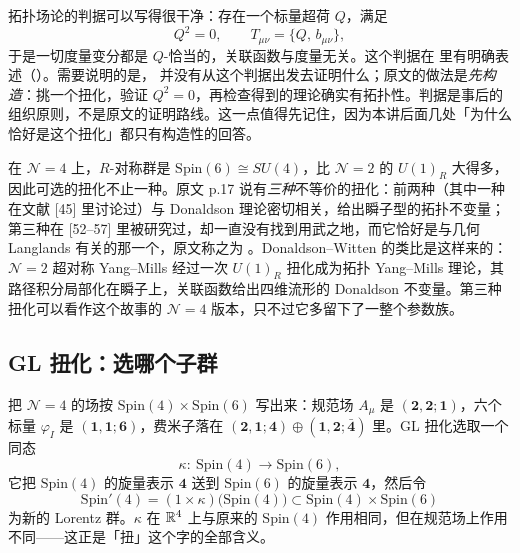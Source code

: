 拓扑场论的判据可以写得很干净：存在一个标量超荷 $Q$，满足
\begin{equation}
Q^2=0,\qquad T_{\mu\nu}=\{Q,\,b_{\mu\nu}\},
\label{eq:top-criterion}
\end{equation}
于是一切度量变分都是 $Q$-恰当的，关联函数与度量无关。这个判据在 \cite{fr09} 里有明确表述（）。需要说明的是，\cite{kw06} 并没有从这个判据出发去证明什么；原文的做法是\emph{先构造}：挑一个扭化，验证 $Q^2=0$，再检查得到的理论确实有拓扑性。判据是事后的组织原则，不是原文的证明路线。这一点值得先记住，因为本讲后面几处「为什么恰好是这个扭化」都只有构造性的回答。

在 $\mathcal N=4$ 上，$R$-对称群是 $\mathrm{Spin}(6)\cong SU(4)$，比 $\mathcal N=2$ 的 $U(1)_R$ 大得多，因此可选的扭化不止一种。原文 p.17 说有\emph{三种}不等价的扭化：前两种（其中一种在文献 [45] 里讨论过）与 Donaldson 理论密切相关，给出瞬子型的拓扑不变量；第三种在 [52--57] 里被研究过，却一直没有找到用武之地，而它恰好是与几何 Langlands 有关的那一个，原文称之为 。Donaldson--Witten 的类比是这样来的：$\mathcal N=2$ 超对称 Yang--Mills 经过一次 $U(1)_R$ 扭化成为拓扑 Yang--Mills 理论，其路径积分局部化在瞬子上，关联函数给出四维流形的 Donaldson 不变量。第三种扭化可以看作这个故事的 $\mathcal N=4$ 版本，只不过它多留下了一整个参数族。

\subsection{GL 扭化：选哪个子群}

把 $\mathcal N=4$ 的场按 $\mathrm{Spin}(4)\times\mathrm{Spin}(6)$ 写出来：规范场 $A_\mu$ 是 $(\mathbf 2,\mathbf 2;\mathbf 1)$，六个标量 $\varphi_I$ 是 $(\mathbf 1,\mathbf 1;\mathbf 6)$，费米子落在 $(\mathbf 2,\mathbf 1;\mathbf 4)\oplus(\mathbf 1,\mathbf 2;\bar{\mathbf 4})$ 里。GL 扭化选取一个同态
\begin{equation}
\kappa:\ \mathrm{Spin}(4)\longrightarrow\mathrm{Spin}(6),
\label{eq:kappa}
\end{equation}
它把 $\mathrm{Spin}(4)$ 的旋量表示 $\mathbf 4$ 送到 $\mathrm{Spin}(6)$ 的旋量表示 $\mathbf 4$，然后令
\begin{equation}
\mathrm{Spin}'(4)=(1\times\kappa)\bigl(\mathrm{Spin}(4)\bigr)\subset \mathrm{Spin}(4)\times\mathrm{Spin}(6)
\label{eq:spinx}
\end{equation}
为新的 Lorentz 群。$\kappa$ 在 $\mathbb{R}^4$ 上与原来的 $\mathrm{Spin}(4)$ 作用相同，但在规范场上作用不同——这正是「扭」这个字的全部含义。


